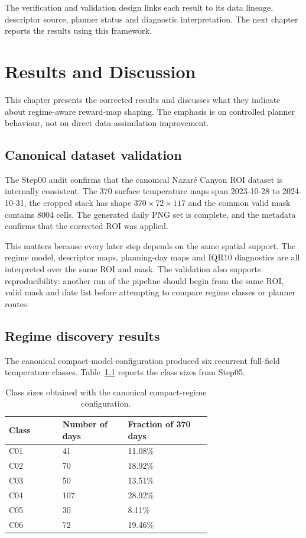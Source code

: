 The verification and validation design links each result to its data lineage, descriptor source, planner status and diagnostic interpretation. The next chapter reports the results using this framework.


\chapter{Results and Discussion} \label{chap:results}

This chapter presents the corrected results and discusses what they indicate about regime-aware reward-map shaping. The emphasis is on controlled planner behaviour, not on direct data-assimilation improvement.

\section{Canonical dataset validation}

The Step00 audit confirms that the canonical Nazar\'e Canyon ROI dataset is internally consistent. The 370 surface temperature maps span 2023-10-28 to 2024-10-31, the cropped stack has shape $370 \times 72 \times 117$ and the common valid mask contains 8004 cells. The generated daily PNG set is complete, and the metadata confirms that the corrected ROI was applied.

This matters because every later step depends on the same spatial support. The regime model, descriptor maps, planning-day maps and IQR10 diagnostics are all interpreted over the same ROI and mask. The validation also supports reproducibility: another run of the pipeline should begin from the same ROI, valid mask and date list before attempting to compare regime classes or planner routes.

\section{Regime discovery results}

The canonical compact-model configuration produced six recurrent full-field temperature classes. Table~\ref{tab:class_sizes} reports the class sizes from Step05.

\begin{table}[htbp]
    \centering
    \small
    \caption{Class sizes obtained with the canonical compact-regime configuration.}
    \label{tab:class_sizes}
    \begin{tabular}{p{0.18\linewidth}p{0.22\linewidth}p{0.28\linewidth}}
        \hline
        Class & Number of days & Fraction of 370 days \\
        \hline
        C01 & 41 & 11.08\% \\
        C02 & 70 & 18.92\% \\
        C03 & 50 & 13.51\% \\
        C04 & 107 & 28.92\% \\
        C05 & 30 & 8.11\% \\
        C06 & 72 & 19.46\% \\
        \hline
    \end{tabular}
\end{table}

